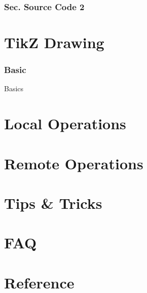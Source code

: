 ﻿\documentclass{beamer}
\begin{document}
\section[Sec. Source Code 2]{Sec. Source Code 2}
\begin{frame}
  
\end{frame}

\part[TikZ Drawing]{TikZ Drawing}
\section[Basic]{Basic}

\begin{frame}{Basics}
\begin{figure}
  \centering
\end{figure}
\end{frame}

\part[Local Operations]{Local Operations}
\begin{frame}
\end{frame}

\part[Remote Operations]{Remote Operations}
\begin{frame}
\end{frame}

\part[Tips \& Tricks]{Tips \& Tricks}
\begin{frame}
\end{frame}

\part[FAQ]{FAQ}
\begin{frame}
\end{frame}

\part[Reference]{Reference}
\end{document}
